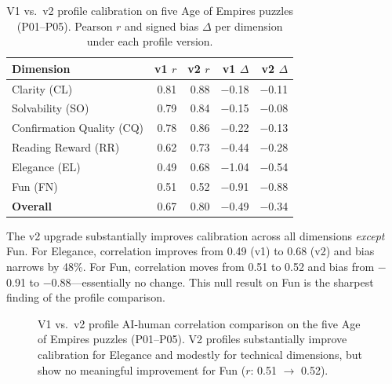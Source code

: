 \begin{table}[htbp]
\centering
\caption{V1 vs.\ v2 profile calibration on five Age of Empires puzzles (P01--P05). Pearson $r$ and signed bias $\Delta$ per dimension under each profile version.}
\label{tab:v1v2}
\begin{tabular}{@{}lrrrr@{}}
\toprule
\textbf{Dimension} & \textbf{v1 $r$} & \textbf{v2 $r$} & \textbf{v1 $\Delta$} & \textbf{v2 $\Delta$} \\
\midrule
Clarity (CL)              & 0.81 & 0.88 & $-$0.18 & $-$0.11 \\
Solvability (SO)          & 0.79 & 0.84 & $-$0.15 & $-$0.08 \\
Confirmation Quality (CQ) & 0.78 & 0.86 & $-$0.22 & $-$0.13 \\
Reading Reward (RR)       & 0.62 & 0.73 & $-$0.44 & $-$0.28 \\
Elegance (EL)             & 0.49 & 0.68 & $-$1.04 & $-$0.54 \\
Fun (FN)                  & 0.51 & 0.52 & $-$0.91 & $-$0.88 \\
\midrule
\textbf{Overall}          & 0.67 & 0.80 & $-$0.49 & $-$0.34 \\
\bottomrule
\end{tabular}
\end{table}

The v2 upgrade substantially improves calibration across all dimensions \emph{except} Fun. For Elegance, correlation improves from 0.49 (v1) to 0.68 (v2) and bias narrows by 48\%. For Fun, correlation moves from 0.51 to 0.52 and bias from $-$0.91 to $-$0.88---essentially no change. This null result on Fun is the sharpest finding of the profile comparison.

\begin{figure}[t]
\centering
{}
\caption{V1 vs.\ v2 profile AI-human correlation comparison on the five Age of Empires puzzles (P01--P05). V2 profiles substantially improve calibration for Elegance and modestly for technical dimensions, but show no meaningful improvement for Fun ($r$: 0.51 $\to$ 0.52).}
\label{fig:v1v2}
\end{figure}

